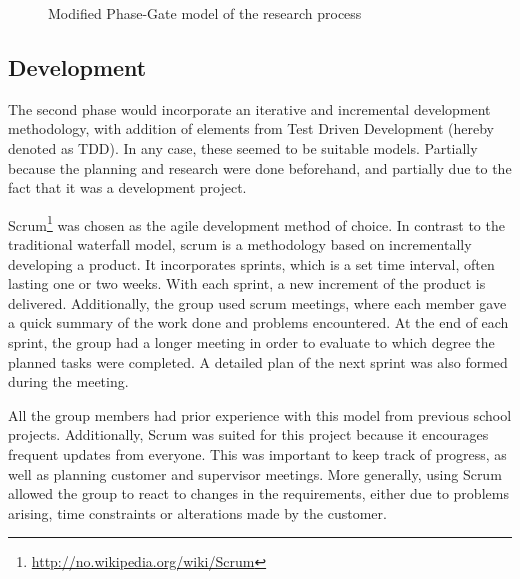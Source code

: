 \begin{center}
  \begin{figure}[ht!]
    \caption{Modified Phase-Gate model of the research process}
    \label{fig:phasegate}
  \end{figure}
\end{center}

\subsection{Development}
\label{subsec:process_and_methodology-process_methodology-development}

The second phase would incorporate an iterative and incremental development methodology, with addition of elements from Test Driven Development (hereby denoted as TDD). In any case, these seemed to be suitable models. Partially because the planning and research were done beforehand, and partially due to the fact that it was a development project.

Scrum\footnote{\url{http://no.wikipedia.org/wiki/Scrum}} was chosen as the agile development method of choice. In contrast to the traditional waterfall model, scrum is a methodology based on incrementally developing a product. It incorporates sprints, which is a set time interval, often lasting one or two weeks. With each sprint, a new increment of the product is delivered. Additionally, the group used scrum meetings, where each member gave a quick summary of the work done and problems encountered. At the end of each sprint, the group had a longer meeting in order to evaluate to which degree the planned tasks were completed. A detailed plan of the next sprint was also formed during the meeting.

All the group members had prior experience with this model from previous school projects. Additionally, Scrum was suited for this project because it encourages frequent updates from everyone. This was important to keep track of progress, as well as planning customer and supervisor meetings. More generally, using Scrum allowed the group to react to changes in the requirements, either due to problems arising, time constraints or alterations made by the customer. 

